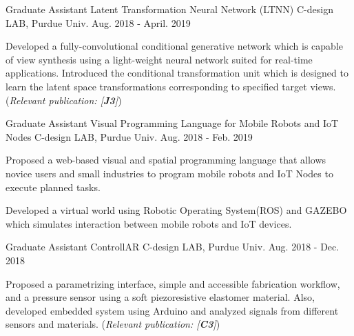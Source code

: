 \begin{cventries}

\cventry
{Graduate Assistant} %
{Latent Transformation Neural Network (LTNN)} %
{C-design LAB, Purdue Univ.} %
{Aug. 2018 - April. 2019} %
{ %
\begin{cvitems}
\item {Developed a fully-convolutional conditional generative network which is capable of view synthesis using a light-weight neural network suited for real-time applications. Introduced the conditional transformation unit which is designed to learn the latent space transformations corresponding to specified target views. (\textit{Relevant publication: [\textbf{J3}]})}
\end{cvitems}
}


\cventry
{Graduate Assistant} %
{Visual Programming Language for Mobile Robots and IoT Nodes} %
{C-design LAB, Purdue Univ.} %
{Aug. 2018 - Feb. 2019} %
{ %
\begin{cvitems}
\item {Proposed a web-based visual and spatial programming language that allows novice users and small industries to program mobile robots and IoT Nodes to execute planned tasks.}
\item {Developed a virtual world using Robotic Operating System(ROS) and GAZEBO which simulates interaction between mobile robots and IoT devices.}
\end{cvitems} 
}


\cventry
{Graduate Assistant} %
{ControllAR} %
{C-design LAB, Purdue Univ.} %
{Aug. 2018 - Dec. 2018} %
{ %
\begin{cvitems}
\item {Proposed a parametrizing interface, simple and accessible fabrication workflow, and a pressure sensor using a soft piezoresistive elastomer material. Also, developed embedded system using Arduino and analyzed signals from different sensors and materials. (\textit{Relevant publication: [\textbf{C3}]})}
\end{cvitems}
}



\end{cventries}
